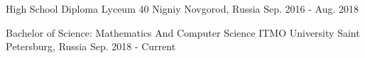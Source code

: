 

\begin{cventries}

  \cventry
    {High School Diploma} %
    {Lyceum 40} %
    {Nigniy Novgorod, Russia} %
    {Sep. 2016 - Aug. 2018} %
    {
    }

  \cventry
    {Bachelor of Science: Mathematics And Computer Science} %
    {ITMO University} %
    {Saint Petersburg, Russia} %
    {Sep. 2018 - Current} %
    {
    }

\end{cventries}

